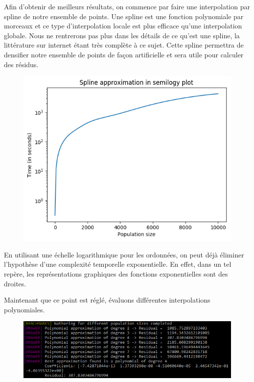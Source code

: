 Afin d'obtenir de meilleurs résultats, on commence par faire une interpolation par spline de notre ensemble de points. Une spline est une fonction polynomiale par morceaux et ce type d'interpolation locale est plus efficace qu'une interpolation globale. Nous ne rentrerons pas plus dans les détails de ce qu'est une spline, la littérature sur internet étant très complète à ce sujet. Cette spline permettra de densifier notre ensemble de points de façon artificielle et sera utile pour calculer des résidus.

\begin{figure}[!h]
    \centering
    \includegraphics[]{report/Pictures/setb4c9_expo_semilogy.png}
\end{figure}

En utilisant une échelle logarithmique pour les ordonnées, on peut déjà éliminer l'hypothèse d'une complexité temporelle exponentielle. En effet, dans un tel repère, les représentations graphiques des fonctions exponentielles sont des droites.

Maintenant que ce point est réglé, évaluons différentes interpolations polynomiales.

\begin{figure}[!h]
    \centering
    \includegraphics[width=\linewidth]{report/Pictures/setb4c9_approximation_result.png}
\end{figure}

